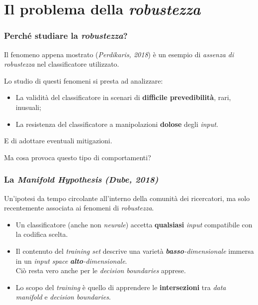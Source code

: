 \documentclass{beamer}
\begin{document}
\section{Il problema della \textit{robustezza}}{

\begin{frame}
	\frametitle{Perché studiare la \textit{robustezza}?}
	Il fenomeno appena mostrato (\textit{Perdikaris, 2018}) è un esempio di \textit{assenza di \alert{robustezza}} nel classificatore utilizzato.
	\hfill\break

	Lo studio di questi fenomeni si presta ad analizzare:
	\hfill\break

	\begin{itemize}
		\item{La validità del classificatore in scenari di \textbf{difficile prevedibilità}, rari, inusuali;}
		\item{La resistenza del classificatore a manipolazioni \textbf{dolose} degli \textit{input}}.
	\end{itemize}
	\hfill\break
	E di adottare eventuali mitigazioni.

	\hfill\break

	Ma cosa provoca questo tipo di comportamenti?
\end{frame}


\begin{frame}
	\frametitle{La \textit{Manifold Hypothesis} \textit{(Dube, 2018)}}
	Un'ipotesi da tempo circolante all'interno della comunità dei ricercatori, ma solo recentemente associata ai fenomeni di \textit{robustezza}.
	\hfill\break

	\begin{itemize}
		\item{Un classificatore (anche non \textit{neurale}) accetta \textbf{qualsiasi} \textit{input} compatibile con la codifica scelta.}
		\item{Il contenuto del \textit{training set} descrive una varietà \textit{\textbf{basso}-dimensionale} immersa in un \textit{input space} \textit{\textbf{alto}-dimensionale}.\\Ciò resta vero anche per le \textit{\alert{decision boundaries}} apprese.}
		\item{Lo scopo del \textit{training} è quello di apprendere le \textbf{intersezioni} tra \textit{data manifold} e \textit{decision boundaries}.}
	\end{itemize}
\end{frame}

}
\end{document}
